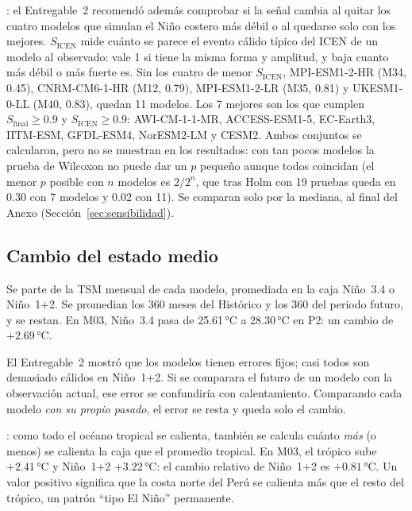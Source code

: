 \documentclass[11pt,a4paper]{article}
\begin{document}
: el Entregable~2 recomendó además comprobar si la señal cambia al quitar los cuatro modelos que simulan el Niño costero más débil o al quedarse solo con los mejores.
$S_{\mathrm{ICEN}}$ mide cuánto se parece el evento cálido típico del ICEN de un modelo al observado: vale 1 si tiene la misma forma y amplitud, y baja cuanto más débil o más fuerte es.
Sin los cuatro de menor $S_{\mathrm{ICEN}}$, MPI-ESM1-2-HR (M34, 0.45), CNRM-CM6-1-HR (M12, 0.79), MPI-ESM1-2-LR (M35, 0.81) y UKESM1-0-LL (M40, 0.83), quedan 11 modelos.
Los 7 mejores son los que cumplen $S_{\mathrm{final}} \geq 0.9$ y $S_{\mathrm{ICEN}} \geq 0.9$: AWI-CM-1-1-MR, ACCESS-ESM1-5, EC-Earth3, IITM-ESM, GFDL-ESM4, NorESM2-LM y CESM2.
Ambos conjuntos se calcularon, pero no se muestran en los resultados: con tan pocos modelos la prueba de Wilcoxon no puede dar un $p$ pequeño aunque todos coincidan (el menor $p$ posible con $n$ modelos es $2/2^n$, que tras Holm con 19 pruebas queda en 0.30 con 7 modelos y 0.02 con 11).
Se comparan solo por la mediana, al final del Anexo (Sección~\ref{sec:sensibilidad}).

\subsection{Cambio del estado medio}
\label{sec:delta}

Se parte de la TSM mensual de cada modelo, promediada en la caja Niño~3.4 o Niño~1+2. 
Se promedian los 360 meses del Histórico y los 360 del periodo futuro, y se restan. 
En M03, Niño~3.4 pasa de 25.61\,°C a 28.30\,°C en P2: un cambio de $+2.69$\,°C.

El Entregable~2 mostró que los modelos tienen errores fijos; casi todos son demasiado cálidos en Niño~1+2. 
Si se comparara el futuro de un modelo con la observación actual, ese error se confundiría con calentamiento. 
Comparando cada modelo \emph{con su propio pasado}, el error se resta y queda solo el cambio.

: como todo el océano tropical se calienta, también se calcula cuánto \emph{más} (o menos) se calienta la caja que el promedio tropical. 
En M03, el trópico sube $+2.41$\,°C y Niño~1+2 $+3.22$\,°C: el cambio relativo de Niño~1+2 es $+0.81$\,°C. 
Un valor positivo significa que la costa norte del Perú se calienta más que el resto del trópico, un patrón ``tipo El Niño'' permanente.
\end{document}
